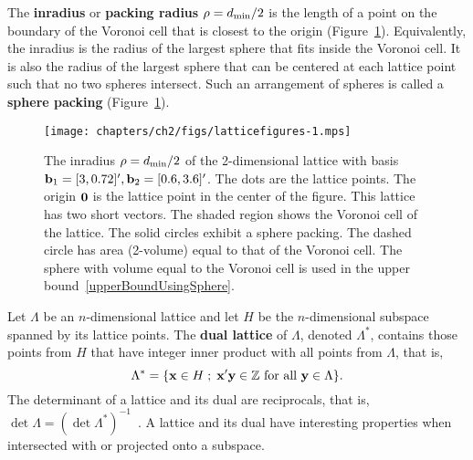 The \textbf{inradius} or \textbf{packing radius} $\rho = d_{\text{min}}/2$ is the length of a point on the boundary of the Voronoi cell that is closest to the origin (Figure~\ref{fig:bound_dmin}).  Equivalently, the inradius is the radius of the largest sphere that fits inside the Voronoi cell.  It is also the radius of the largest sphere that can be centered at each lattice point such that no two spheres intersect.  Such an arrangement of spheres is called a \textbf{sphere packing} (Figure~\ref{fig:bound_dmin}).

\begin{figure}[t]
\begin{center}   
\texttt{[image: chapters/ch2/figs/latticefigures-1.mps]}
\caption{The inradius $\rho = d_{\text{min}}/2$ of the 2-dimensional lattice with basis $\mathbf{b}_1 = [3,0.72]^\prime, \mathbf{b}_2 = [0.6,3.6]^\prime$. The dots are the lattice points.  The origin $\boldsymbol{0}$ is the lattice point in the center of the figure.  This lattice has two short vectors.  The shaded region shows the Voronoi cell of the lattice.  The solid circles exhibit a sphere packing.  The dashed circle has area (2-volume) equal to that of the Voronoi cell. The sphere with volume equal to the Voronoi cell is used in the upper bound~\ref{upperBoundUsingSphere}.}
\label{fig:bound_dmin}
\end{center}  
\end{figure} 


Let $\Lambda$ be an $n$-dimensional lattice and let $H$ be the $n$-dimensional subspace spanned by its lattice points. The \textbf{dual lattice} of $\Lambda$, denoted $\Lambda^*$, contains those points from $H$ that have integer inner product with all points from $\Lambda$, that is,
\[
\Lambda^* = \{ \mathbf{x}  \in H \; ; \; \mathbf{x}^\prime \mathbf{y} \in {\mathbb Z} \text{ for all } \mathbf{y} \in \Lambda \}.
\]
The determinant of a lattice and its dual are reciprocals, that is, $\det\Lambda = (\det\Lambda^*)^{-1}$~\cite[p. 10]{SPLAG}.  A lattice and its dual have interesting properties when intersected with or projected onto a subspace.  %


